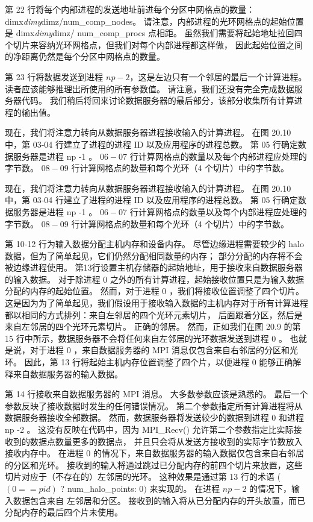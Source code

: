 第 22 行将每个内部进程的发送地址前进每个分区中网格点的数量：dimx\textit{dimy}dimz/num\_comp\_nodes。 
请注意，内部进程的光环网格点的起始位置是 dimx\textit{dimy}dimz/ num\_comp\_procs 点相距。 
虽然我们需要将起始地址拉回四个切片来容纳光环网格点，但我们对每个内部进程都这样做，
因此起始位置之间的净距离仍然是每个分区中网格点的数量。

第 23 行将数据发送到进程 $n p-2$，这是左边只有一个邻居的最后一个计算进程。 读者应该能够推理出所使用的所有参数值。 
请注意，我们还没有完全完成数据服务器代码。 我们稍后将回来讨论数据服务器的最后部分，该部分收集所有计算进程的输出值。

现在，我们将注意力转向从数据服务器进程接收输入的计算进程。 
在图 20.10 中，第 03-04 行建立了进程的进程 ID 以及应用程序的进程总数。 第 05 行确定数据服务器是进程 np -1 。 
$06-07$ 行计算网格点的数量以及每个内部进程应处理的字节数。 $08-09$ 行计算网格点的数量和每个光环（4 个切片）中的字节数。

现在，我们将注意力转向从数据服务器进程接收输入的计算进程。 
在图 20.10 中，第 03-04 行建立了进程的进程 ID 以及应用程序的进程总数。 第 05 行确定数据服务器是进程 np -1 。 
$06-07$ 行计算网格点的数量以及每个内部进程应处理的字节数。 $08-09$ 行计算网格点的数量和每个光环（4 个切片）中的字节数。

第 10-12 行为输入数据分配主机内存和设备内存。 
尽管边缘进程需要较少的 halo 数据，但为了简单起见，它们仍然分配相同数量的内存； 部分分配的内存将不会被边缘进程使用。 
第13行设置主机存储器的起始地址，用于接收来自数据服务器的输入数据。 
对于除进程 0 之外的所有计算进程，起始接收位置只是为输入数据分配的内存的起始位置。 
然而，对于进程 0 ，我们将接收位置调整了四个切片。 
这是因为为了简单起见，我们假设用于接收输入数据的主机内存对于所有计算进程都以相同的方式排列：来自左邻居的四个光环元素切片，
后面跟着分区，然后是来自左邻居的四个光环元素切片。 正确的邻居。 
然而，正如我们在图 20.9 的第 15 行中所示，数据服务器不会将任何来自左邻居的光环数据发送到进程 0 。 
也就是说，对于进程 0 ，来自数据服务器的 MPI 消息仅包含来自右邻居的分区和光环。 
因此，第 13 行将起始主机内存位置调整了四个片，以便进程 0 能够正确解释来自数据服务器的输入数据。

第 14 行接收来自数据服务器的 MPI 消息。 大多数参数应该是熟悉的。 最后一个参数反映了接收数据时发生的任何错误情况。 
第二个参数指定所有计算进程将从数据服务器接收全部数据。 然而，数据服务器将发送较少的数据到进程 0 和进程 $\mathrm{np}$ -2 。 
这没有反映在代码中，因为 MPI\_Recv() 允许第二个参数指定比实际接收到的数据点数量更多的数据点，
并且只会将从发送方接收到的实际字节数放入接收内存中。 
在进程 0 的情况下，来自数据服务器的输入数据仅包含来自右邻居的分区和光环。 
接收到的输入将通过跳过已分配内存的前四个切片来放置，这些切片对应于（不存在的）左邻居的光环。 
这种效果是通过第 13 行的术语 ( $(0==p i d)$ ? num\_halo\_points: 0$)$ 来实现的。
在进程 $n p-2$ 的情况下，输入数据包含来自 左邻居和分区。 
接收到的输入将从已分配内存的开头放置，而已分配内存的最后四个片未使用。

